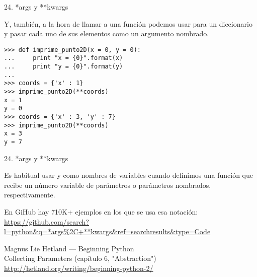 \begin{frame}[fragile]{24. *args y **kwargs}
  \begin{block}{}
    \small
    \centering
    Y, también, a la hora de llamar a una función podemos usar
    \structure{**} para  un diccionario y
    pasar cada uno de sus elementos como un argumento nombrado.
  \end{block}

  \begin{exampleblock}{}
    \scriptsize
    \begin{lstlisting}
>>> def imprime_punto2D(x = 0, y = 0):
...     print "x = {0}".format(x)
...     print "y = {0}".format(y)
...
>>> coords = {'x' : 1}
>>> imprime_punto2D(**coords)
x = 1
y = 0
>>> coords = {'x' : 3, 'y' : 7}
>>> imprime_punto2D(**coords)
x = 3
y = 7
    \end{lstlisting}
  \end{exampleblock}
\end{frame}

\begin{frame}[fragile]{24. *args y **kwargs}
  \begin{block}{}
    \small
    \centering
    Es habitual usar  y  como
    nombres de variables cuando definimos una función que recibe un
    número variable de parámetros o parámetros nombrados,
    respectivamente.
  \end{block}

  \footnotesize
  \begin{block}
    {\centering
      En GiHub hay 710K+ ejemplos en los que se usa esa notación:}
    \centering
    \url{https://github.com/search?l=python&q=*args\%2C+**kwargs&ref=searchresults&type=Code}
  \end{block}

\begin{block}
    {\centering
      Magnus Lie Hetland — Beginning Python \\
      Collecting Parameters (capítulo 6, "Abstraction")
    }
    \centering \url{http://hetland.org/writing/beginning-python-2/}
  \end{block}
\end{frame}
